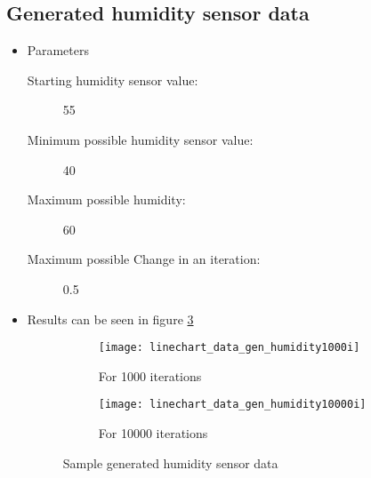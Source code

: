             \subsection{Generated humidity sensor data}
                \begin{itemize}
                    \item Parameters
                        \begin{description}
                            \item[Starting humidity sensor value:] 55
                            \item[Minimum possible humidity sensor value:] 40
                            \item[Maximum possible humidity:] 60
                            \item[Maximum possible Change in an iteration:] 0.5
                        \end{description}
                    \item Results can be seen in figure \ref{fig:gen_humidity}
                        \begin{figure}
                            \centering
                            \captionsetup{type=figure}
                            \begin{subfigure}[b]{0.45\textwidth}
                                \centering
                                \texttt{[image: linechart\_data\_gen\_humidity1000i]}
                                \caption{For 1000 iterations}
                                \label{chart:gen_humidity_1000}
                            \end{subfigure}
                            \hfill
                            \begin{subfigure}[b]{0.45\textwidth}
                                \centering
                                \texttt{[image: linechart\_data\_gen\_humidity10000i]}
                                \caption{For 10000 iterations}
                                \label{chart:gen_humidity_10000}
                            \end{subfigure}
                            
                            \caption{Sample generated humidity sensor data }
                            \label{fig:gen_humidity}
                        \end{figure}
                    \end{itemize}

